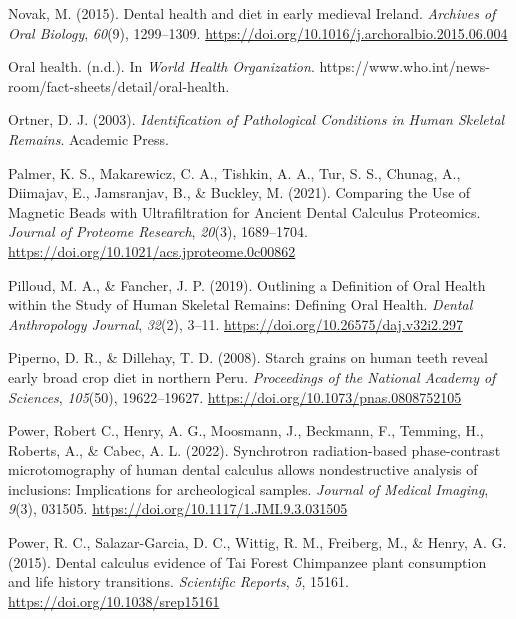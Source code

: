 \documentclass[
  b5paper,
]{book}
\newlength{\cslhangindent}
\newenvironment{CSLReferences}[2] %
 {\begin{list}{}{%
  \setlength{\itemindent}{0pt}
  \setlength{\leftmargin}{0pt}
  \setlength{\parsep}{0pt}
  \ifodd #1
   \setlength{\leftmargin}{\cslhangindent}
   \setlength{\itemindent}{-1\cslhangindent}
  \fi
  \setlength{\itemsep}{#2\baselineskip}}}
 {\end{list}}
\begin{document}
\begin{CSLReferences}{1}{0}
Novak, M. (2015). Dental health and diet in early medieval {Ireland}.
\emph{Archives of Oral Biology}, \emph{60}(9), 1299--1309.
\url{https://doi.org/10.1016/j.archoralbio.2015.06.004}

Oral health. (n.d.). In \emph{World Health Organization}.
https://www.who.int/news-room/fact-sheets/detail/oral-health.

Ortner, D. J. (2003). \emph{Identification of {Pathological Conditions}
in {Human Skeletal Remains}}. {Academic Press}.

Palmer, K. S., Makarewicz, C. A., Tishkin, A. A., Tur, S. S., Chunag,
A., Diimajav, E., Jamsranjav, B., \& Buckley, M. (2021). Comparing the
{Use} of {Magnetic Beads} with {Ultrafiltration} for {Ancient Dental
Calculus Proteomics}. \emph{Journal of Proteome Research}, \emph{20}(3),
1689--1704. \url{https://doi.org/10.1021/acs.jproteome.0c00862}

Pilloud, M. A., \& Fancher, J. P. (2019). Outlining a {Definition} of
{Oral Health} within the {Study} of {Human Skeletal Remains}: {Defining
Oral Health}. \emph{Dental Anthropology Journal}, \emph{32}(2), 3--11.
\url{https://doi.org/10.26575/daj.v32i2.297}

Piperno, D. R., \& Dillehay, T. D. (2008). Starch grains on human teeth
reveal early broad crop diet in northern {Peru}. \emph{Proceedings of
the National Academy of Sciences}, \emph{105}(50), 19622--19627.
\url{https://doi.org/10.1073/pnas.0808752105}

Power, Robert C., Henry, A. G., Moosmann, J., Beckmann, F., Temming, H.,
Roberts, A., \& Cabec, A. L. (2022). Synchrotron radiation-based
phase-contrast microtomography of human dental calculus allows
nondestructive analysis of inclusions: Implications for archeological
samples. \emph{Journal of Medical Imaging}, \emph{9}(3), 031505.
\url{https://doi.org/10.1117/1.JMI.9.3.031505}

Power, R. C., Salazar-Garcia, D. C., Wittig, R. M., Freiberg, M., \&
Henry, A. G. (2015). Dental calculus evidence of {Tai Forest Chimpanzee}
plant consumption and life history transitions. \emph{Scientific
Reports}, \emph{5}, 15161. \url{https://doi.org/10.1038/srep15161}


\end{CSLReferences}
\end{document}
